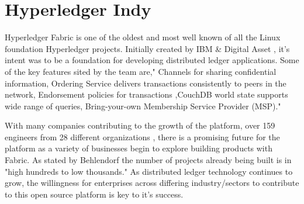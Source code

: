 \section{Hyperledger Indy}

Hyperledger Fabric is one of the oldest and most well known of all the 
Linux foundation Hyperledger projects. Initially created by IBM & Digital 
Asset , it’s intent was to be a foundation for developing distributed ledger 
applications. Some of the key features sited by the team are," Channels for 
sharing confidential information, Ordering Service delivers transactions 
consistently to peers in the network, Endorsement policies for transactions
,CouchDB world state supports wide range of queries, Bring-your-own Membership 
Service Provider (MSP)."\cite{Hyperledger Fabric}

With many companies contributing to the growth of the platform, over 159 engineers
from 28 different organizations \cite{Behlendorf Interview}, there is a promising
future for the platform as a variety of businesses begin to explore building products
with Fabric. As stated by Behlendorf the number of projects already being built is in
"high hundreds to low thousands." \cite{Behlendorf Interview} As distributed ledger
technology continues to grow, the willingness for enterprises across differing
industry/sectors to contribute to this open source platform is key to it's 
success.

